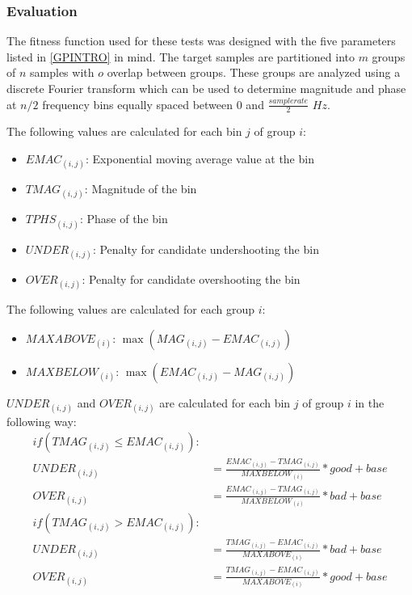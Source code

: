 \documentclass[12pt]{article}
\begin{document}
\subsubsection{Evaluation}\label{TMEVAL}
The fitness function used for these tests was designed with the five parameters listed in \ref{GPINTRO} in mind. The target samples are partitioned into $m$ groups of $n$ samples with $o$ overlap between groups. These groups are analyzed using a discrete Fourier transform which can be used to determine magnitude and phase at $n/2$ frequency bins equally spaced between $0$ and $\frac{sample rate}{2}$ $Hz$.

The following values are calculated for each bin $j$ of group $i$:
\begin{itemize}
\addtolength{\itemindent}{1cm}
\vspace{-3mm}
\item $EMAC_{(i, j)}$: Exponential moving average value at the bin
\vspace{-3mm}
\item $TMAG_{(i, j)}$: Magnitude of the bin
\vspace{-3mm}
\item $TPHS_{(i, j)}$: Phase of the bin
\vspace{-3mm}
\item $UNDER_{(i, j)}$: Penalty for candidate undershooting the bin
\vspace{-3mm}
\item $OVER_{(i, j)}$: Penalty for candidate overshooting the bin
\vspace{-2mm}
\end{itemize}

The following values are calculated for each group $i$:
\begin{itemize}
\addtolength{\itemindent}{1cm}
\vspace{-3mm} 
\item $MAXABOVE_{(i)}$: $\max{(MAG_{(i, j)} - EMAC_{(i, j)})}$
\vspace{-3mm} 
\item $MAXBELOW_{(i)}$: $\max{(EMAC_{(i, j)} - MAG_{(i, j)})}$
\vspace{-2mm}
\end{itemize}

$UNDER_{(i, j)}$ and $OVER_{(i, j)}$ are calculated for each bin $j$ of group $i$ in the following way:
\vspace{-3mm} 
\begin{align*}
if (TMAG_{(i, j)} \le EMAC_{(i, j)}): \\
UNDER_{(i, j)} &= \frac{EMAC_{(i, j)} - TMAG_{(i, j)}}{MAXBELOW_{(i)}} * good + base \\
OVER_{(i, j)} &= \frac{EMAC_{(i, j)} - TMAG_{(i, j)}}{MAXBELOW_{(i)}} * bad + base \\
if (TMAG_{(i, j)} > EMAC_{(i, j)}): \\
UNDER_{(i, j)} &= \frac{TMAG_{(i, j)} - EMAC_{(i, j)}}{MAXABOVE_{(i)}} * bad + base \\
OVER_{(i, j)} &= \frac{TMAG_{(i, j)} - EMAC_{(i, j)}}{MAXABOVE_{(i)}} * good + base
\end{align*}
\vspace{-2mm}
\end{document}
